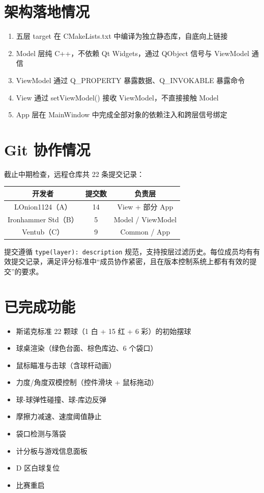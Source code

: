 \documentclass[11pt]{ctexart}
\begin{document}
\section{架构落地情况}

\begin{enumerate}[leftmargin=*]
\item 五层 target 在 CMakeLists.txt 中编译为独立静态库，自底向上链接
\item Model 层纯 C++，不依赖 Qt Widgets，通过 QObject 信号与 ViewModel 通信
\item ViewModel 通过 Q\_PROPERTY 暴露数据、Q\_INVOKABLE 暴露命令
\item View 通过 setViewModel() 接收 ViewModel，不直接接触 Model
\item App 层在 MainWindow 中完成全部对象的依赖注入和跨层信号绑定
\end{enumerate}

\section{Git 协作情况}

截止中期检查，远程仓库共 22 条提交记录：

\begin{center}
\begin{tabular}{|c|c|c|}
\hline
\textbf{开发者} & \textbf{提交数} & \textbf{负责层} \\
\hline
LOnion1124（A） & 14 & View + 部分 App \\
Ironhammer Std（B） & 5 & Model / ViewModel \\
Ventub（C） & 9 & Common / App \\
\hline
\end{tabular}
\end{center}

提交遵循 \texttt{type(layer): description} 规范，支持按层过滤历史。每位成员均有有效提交记录，满足评分标准中“成员协作紧密，且在版本控制系统上都有有效的提交”的要求。

\section{已完成功能}

\begin{itemize}
\item 斯诺克标准 22 颗球（1 白 + 15 红 + 6 彩）的初始摆球
\item 球桌渲染（绿色台面、棕色库边、6 个袋口）
\item 鼠标瞄准与击球（含球杆动画）
\item 力度/角度双模控制（控件滑块 + 鼠标拖动）
\item 球-球弹性碰撞、球-库边反弹
\item 摩擦力减速、速度阈值静止
\item 袋口检测与落袋
\item 计分板与游戏信息面板
\item D 区白球复位
\item 比赛重启
\end{itemize}
\end{document}
